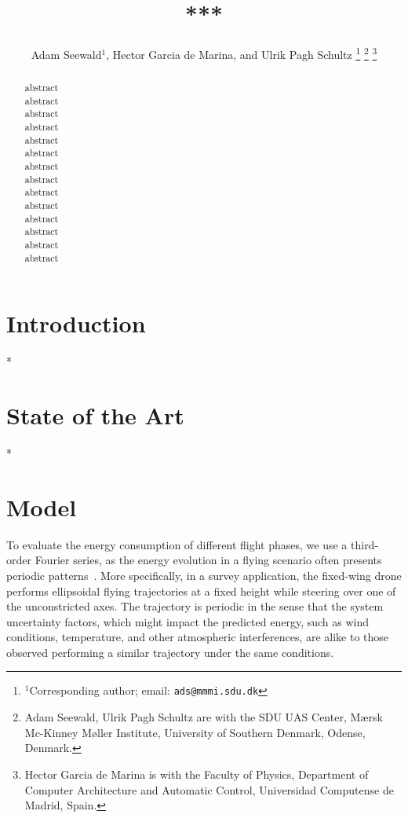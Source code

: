 \documentclass[letterpaper,10pt,conference]{ieeeconf}
\title{\LARGE \bf
***
}
\author{
  Adam Seewald$^{1}$, Hector Garcia de Marina, and Ulrik Pagh Schultz
  \thanks{$^{1}$Corresponding author; email: {\tt\small ads@mmmi.sdu.dk}}
  \thanks{Adam Seewald, Ulrik Pagh Schultz are with the SDU UAS Center, M{\ae}rsk Mc-Kinney M{\o}ller Institute, University of Southern Denmark, Odense, Denmark.}
  \thanks{Hector Garcia de Marina is with the Faculty of Physics, Department of Computer Architecture and Automatic Control, Universidad Computense de Madrid, Spain.}
}
\begin{document}
\maketitle

\thispagestyle{empty}
\pagestyle{empty}

\begin{abstract}

  abstract\\
  abstract\\
  abstract\\
  abstract\\
  abstract\\
  abstract\\
  abstract\\
  abstract\\
  abstract\\
  abstract\\
  abstract\\
  abstract\\
  abstract\\
  abstract
\end{abstract}

%
\IEEEpeerreviewmaketitle

\section{Introduction}

*

\section{State of the Art}
\label{sec:related}

*

\section{Model}
\label{sec:estimation}

To evaluate the energy consumption of different flight phases, we use a third-order Fourier series, as the energy evolution in a flying scenario often presents periodic patterns~\cite{seewald2020towards}. More specifically, in a survey application, the fixed-wing drone performs ellipsoidal flying trajectories at a fixed height while steering over one of the unconstricted axes. The trajectory is periodic in the sense that the system uncertainty factors, which might impact the predicted energy, such as wind conditions, temperature, and other atmospheric interferences, are alike to those observed performing a similar trajectory under the same conditions.
\end{document}
